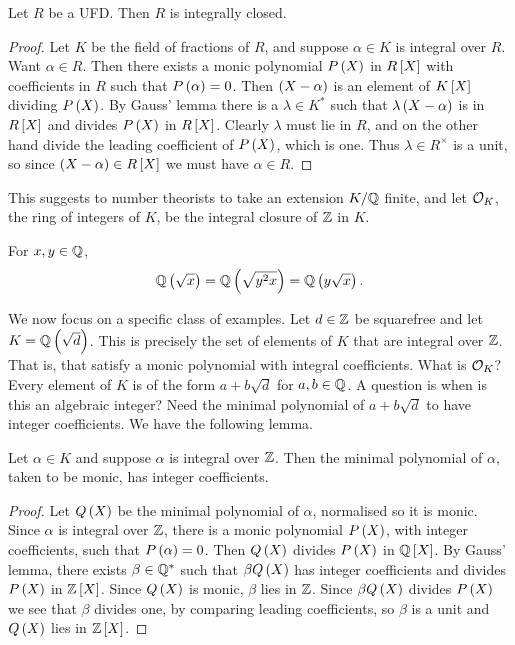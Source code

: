 \pagebreak

\begin{theorem}
Let $ R $ be a UFD. Then $ R $ is integrally closed.
\end{theorem}

\begin{proof}
Let $ K $ be the field of fractions of $ R $, and suppose $ \alpha \in K $ is integral over $ R $. Want $ \alpha \in R $. Then there exists a monic polynomial $ P\br{X} $ in $ R\sbr{X} $ with coefficients in $ R $ such that $ P\br{\alpha} = 0 $. Then $ \br{X - \alpha} $ is an element of $ K\sbr{X} $ dividing $ P\br{X} $. By Gauss' lemma there is a $ \lambda \in K^* $ such that $ \lambda\br{X - \alpha} $ is in $ R\sbr{X} $ and divides $ P\br{X} $ in $ R\sbr{X} $. Clearly $ \lambda $ must lie in $ R $, and on the other hand divide the leading coefficient of $ P\br{X} $, which is one. Thus $ \lambda \in R^\times $ is a unit, so since $ \br{X - \alpha} \in R\sbr{X} $ we must have $ \alpha \in R $.
\end{proof}

This suggests to number theorists to take an extension $ K / \mathbb{Q} $ finite, and let $ \mathcal{O}_K $, the ring of integers of $ K $, be the integral closure of $ \mathbb{Z} $ in $ K $.

\begin{note*}
For $ x, y \in \mathbb{Q} $,
$$ \Q\br{\sqrt{x}} = \Q\br{\sqrt{y^2x}} = \Q\br{y\sqrt{x}}. $$
\end{note*}

We now focus on a specific class of examples. Let $ d \in \mathbb{Z} $ be squarefree and let $ K = \Q\br{\sqrt{d}} $. This is precisely the set of elements of $ K $ that are integral over $ \mathbb{Z} $. That is, that satisfy a monic polynomial with integral coefficients. What is $ \mathcal{O}_K $? Every element of $ K $ is of the form $ a + b\sqrt{d} $ for $ a, b \in \mathbb{Q} $. A question is when is this an algebraic integer? Need the minimal polynomial of $ a + b\sqrt{d} $ to have integer coefficients. We have the following lemma.

\begin{lemma}
Let $ \alpha \in K $ and suppose $ \alpha $ is integral over $ \mathbb{Z} $. Then the minimal polynomial of $ \alpha $, taken to be monic, has integer coefficients.
\end{lemma}

\begin{proof}
Let $ Q\br{X} $ be the minimal polynomial of $ \alpha $, normalised so it is monic. Since $ \alpha $ is integral over $ \mathbb{Z} $, there is a monic polynomial $ P\br{X} $, with integer coefficients, such that $ P\br{\alpha} = 0 $. Then $ Q\br{X} $ divides $ P\br{X} $ in $ \Q\sbr{X} $. By Gauss' lemma, there exists $ \beta \in \mathbb{Q}^* $ such that $ \beta Q\br{X} $ has integer coefficients and divides $ P\br{X} $ in $ \Z\sbr{X} $. Since $ Q\br{X} $ is monic, $ \beta $ lies in $ \mathbb{Z} $. Since $ \beta Q\br{X} $ divides $ P\br{X} $ we see that $ \beta $ divides one, by comparing leading coefficients, so $ \beta $ is a unit and $ Q\br{X} $ lies in $ \Z\sbr{X} $.
\end{proof}


